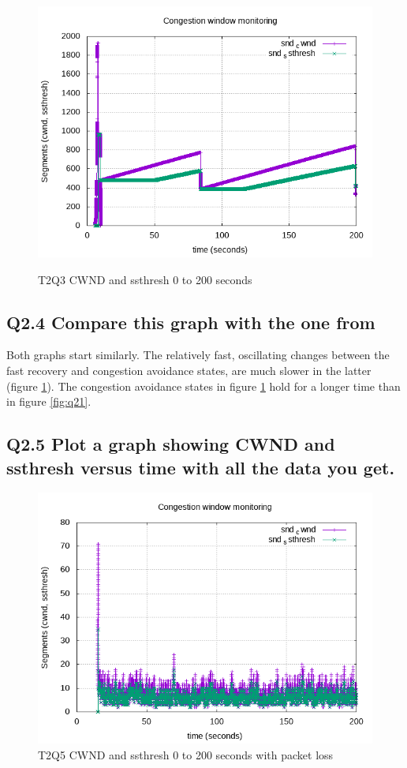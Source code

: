 \documentclass{article}
\begin{document}
\begin{figure}[H]
	\includegraphics{lab1-group1-task2-question3.png}
	\label{fig:q23}
	\caption{T2Q3 CWND and ssthresh 0 to 200 seconds}
\end{figure}


\subsection{Q2.4 Compare this graph with the one from}

Both graphs start similarly. The relatively fast, oscillating changes between
the fast recovery and congestion avoidance states, are much slower in the
latter (figure \ref{fig:q23}). The congestion avoidance states in figure \ref{fig:q23} hold for a longer time than in figure \ref{fig:q21}. 


\subsection{Q2.5 Plot a graph showing CWND and ssthresh versus time with all the data you get.}

\begin{figure}[H]
	\includegraphics{lab1-group1-task2-question5.png}
	\caption{T2Q5 CWND and ssthresh 0 to 200 seconds with packet loss}
\end{figure}
\end{document}
